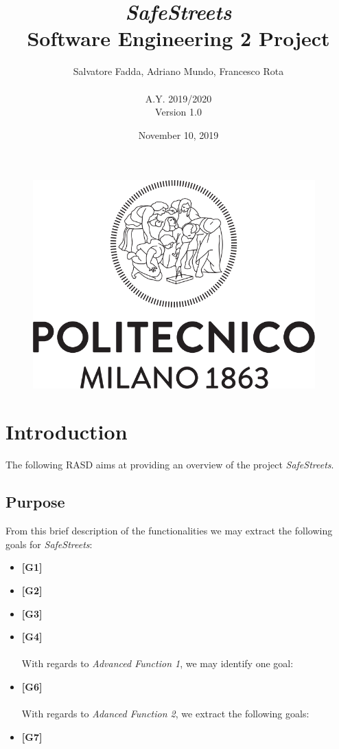 \documentclass {article}
\begin{document}
\begin{figure}
\centering
	\includegraphics[height=8cm]{polimi_logo.png}
\end{figure}


\title {{\Huge \it SafeStreets} \\ \Large Software Engineering 2 Project}
\author{Salvatore Fadda, Adriano Mundo, Francesco Rota
		\\ \\ A.Y. 2019/2020 \\ Version 1.0}
\date{November 10, 2019}


\maketitle
\newpage

	
\pagebreak
\tableofcontents{}
\pagebreak


\section{Introduction}
The following RASD aims at providing an overview of the project {\it SafeStreets}. 

	
	\subsection{Purpose}

From this brief description of the functionalities we may extract the following goals for {\it SafeStreets}: 
		
		\begin{itemize} %

   			 \item {\bf [G1]} 			
			 \item {\bf [G2]} 
   			 \item {\bf [G3]}    			  
   			 \item {\bf [G4]} 
   			 \\
			 \\
With regards to {\it {\it Advanced Function 1}}, we may identify one goal: 
   			 \item {\bf [G6]}\\
			 \\
 With regards to {\it Adanced Function 2}, we extract the following goals:
			  \item {\bf [G7]} 			
			  \end{itemize}
			
\end{document}
